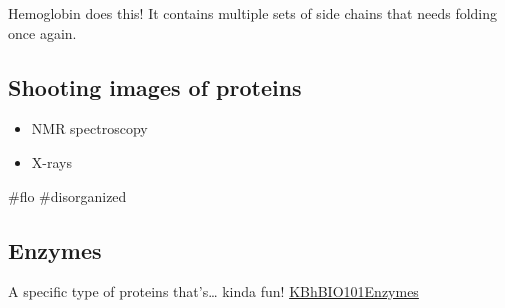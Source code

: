 \documentclass[letterpaper]{article}
\begin{document}
Hemoglobin does this! It contains multiple sets of side chains that
needs folding once again.

\subsection{Shooting images of proteins}
\label{sec:org01ddee1}
\begin{itemize}
\item NMR spectroscopy
\item X-rays
\end{itemize}

\#flo \#disorganized

\subsection{Enzymes}
\label{sec:orga96de92}
A specific type of proteins that's\ldots{} kinda fun!
\href{KBhBIO101Enzymes.org}{KBhBIO101Enzymes}
\end{document}

